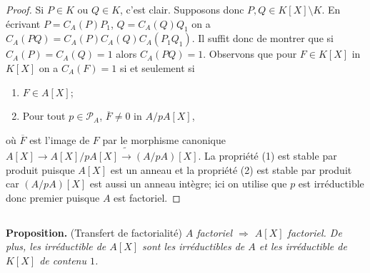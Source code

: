 \documentclass[a4paper, oneside, 12pt]{book}
\theoremstyle{theoremeStyle} %
\theoremstyle{definition} %
\begin{document}
\begin{proof}Si $P\in K$ ou $Q\in K$, c'est clair. Supposons donc $P,Q\in K[X]\setminus K$. En écrivant $P=C_A(P)P_1$, $Q=C_A(Q)Q_1$ on a $C_A(PQ)=C_A(P)C_A(Q)C_A(P_1Q_1)$. Il suffit donc de montrer que si $C_A(P)=C_A(Q)=1$ alors $C_A(PQ)=1$. Observons que pour $F\in K[X]$ in $K[X]$ on a  $C_A(F)=1$ si et seulement si
\begin{enumerate}
\item $F\in A[X]$;
\item  Pour tout $p\in\mathcal{P}_A$, $\overline{F}\not=0$ in $A/pA[X]$,
\end{enumerate}
où $\overline{F}$ est l'image de $F$ par le morphisme canonique $A[X]\rightarrow A[X]/pA[X]\tilde{\rightarrow} (A/pA)[X]$. La propriété (1) est  stable par produit puisque $A[X]$ est un anneau et la propriété (2) est stable par produit car $(A/pA)[X]$ est aussi un anneau intègre; ici on utilise que $p$ est irréductible donc premier puisque $A$ est factoriel.\end{proof}
%
%



\subsection{}\label{FactTransfert}\textbf{Proposition.} (Transfert de factorialité) \textit{$A$ factoriel $\Rightarrow$ $A[X]$ factoriel. De plus, les  irréductible de $A[X]$ sont les irréductibles de $A$ et les irréductible de $K[X]$ de contenu $1$.}\\
\end{document}
